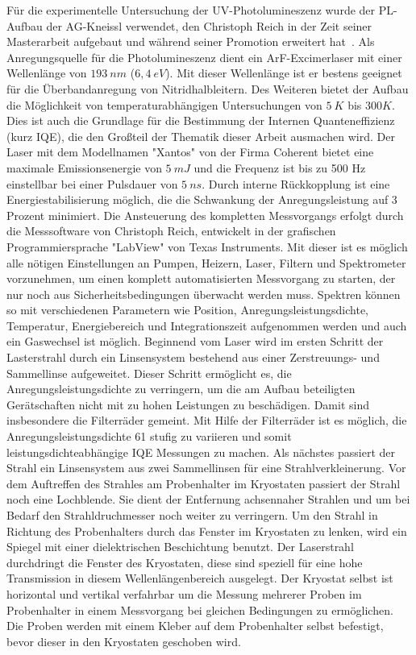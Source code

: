 Für die experimentelle Untersuchung der UV-Photolumineszenz wurde der PL-Aufbau der AG-Kneissl verwendet, den Christoph Reich in der Zeit seiner Masterarbeit aufgebaut und während seiner Promotion erweitert hat~\cite{creich}. 
Als Anregungsquelle für die Photolumineszenz dient ein ArF-Excimerlaser mit einer Wellenlänge von $193 \ nm$ ($6,4 \ eV$). Mit dieser Wellenlänge ist er bestens geeignet für die Überbandanregung von Nitridhalbleitern. 
Des Weiteren bietet der Aufbau die Möglichkeit von temperaturabhängigen Untersuchungen von $5 \ K $ bis $300 K$. Dies ist auch die Grundlage für die Bestimmung der Internen Quanteneffizienz (kurz IQE), die den Großteil der Thematik dieser Arbeit ausmachen wird. 
\newline
Der Laser mit dem Modellnamen  "Xantos" von der Firma Coherent bietet eine maximale Emissionsenergie von $ 5 \ mJ $ und die Frequenz ist bis zu 500 Hz einstellbar bei einer Pulsdauer von $5 \ ns$. 
Durch interne Rückkopplung ist eine Energiestabilisierung möglich, die die Schwankung der Anregungsleistung auf 3 Prozent minimiert. 
\newline
Die Ansteuerung des kompletten Messvorgangs erfolgt durch die Messsoftware von Christoph Reich, entwickelt in der grafischen Programmiersprache "LabView" von Texas Instruments. Mit dieser ist es möglich alle nötigen Einstellungen an Pumpen, Heizern, Laser, Filtern und Spektrometer vorzunehmen, um einen komplett automatisierten Messvorgang zu starten, der nur noch aus Sicherheitsbedingungen überwacht werden muss. Spektren können so mit verschiedenen Parametern wie Position, Anregungsleistungsdichte, Temperatur, Energiebereich und Integrationszeit aufgenommen werden und auch ein Gaswechsel ist möglich.
\newline
Beginnend vom Laser wird im ersten Schritt der Lasterstrahl durch ein Linsensystem bestehend aus einer Zerstreuungs- und Sammellinse aufgeweitet. Dieser Schritt ermöglicht es, die Anregungsleistungsdichte zu verringern, um die am Aufbau beteiligten Gerätschaften nicht mit zu hohen Leistungen zu beschädigen. Damit sind insbesondere die Filterräder gemeint. Mit Hilfe der Filterräder ist es möglich, die Anregungsleistungsdichte 61 stufig zu variieren und somit leistungsdichteabhängige IQE Messungen zu machen. Als nächstes passiert der Strahl ein Linsensystem aus zwei Sammellinsen für eine Strahlverkleinerung. Vor dem Auftreffen des Strahles am Probenhalter im Kryostaten passiert der Strahl noch eine Lochblende. Sie dient der Entfernung achsennaher Strahlen und um bei Bedarf den Strahldruchmesser noch weiter zu verringern. Um den Strahl in Richtung des Probenhalters durch das Fenster im Kryostaten zu lenken, wird ein Spiegel mit einer dielektrischen Beschichtung benutzt. Der Laserstrahl durchdringt die Fenster des Kryostaten, diese sind speziell für eine hohe Transmission in diesem Wellenlängenbereich ausgelegt. Der Kryostat selbst ist horizontal und vertikal verfahrbar um die Messung mehrerer Proben im Probenhalter in einem Messvorgang bei gleichen Bedingungen zu ermöglichen. Die Proben werden mit einem Kleber auf dem Probenhalter selbst befestigt, bevor dieser in den Kryostaten geschoben wird. 
